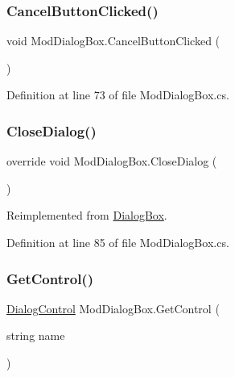 \subsubsection{\texorpdfstring{Cancel\+Button\+Clicked()}{CancelButtonClicked()}}
{\footnotesize\ttfamily void Mod\+Dialog\+Box.\+Cancel\+Button\+Clicked (\begin{DoxyParamCaption}{ }\end{DoxyParamCaption})}



Definition at line 73 of file Mod\+Dialog\+Box.\+cs.

\mbox{\label{class_mod_dialog_box_ad5168655ce50919439a1a6f2c0dcb207}} 
\subsubsection{\texorpdfstring{Close\+Dialog()}{CloseDialog()}}
{\footnotesize\ttfamily override void Mod\+Dialog\+Box.\+Close\+Dialog (\begin{DoxyParamCaption}{ }\end{DoxyParamCaption})\hspace{0.3cm}{\ttfamily [virtual]}}



Reimplemented from \hyperlink{class_dialog_box_ad4f408b78d5e109525c229ad34f5a447}{Dialog\+Box}.



Definition at line 85 of file Mod\+Dialog\+Box.\+cs.

\mbox{\label{class_mod_dialog_box_a2a5dae99d27fad2ba666e6833622688c}} 
\subsubsection{\texorpdfstring{Get\+Control()}{GetControl()}}
{\footnotesize\ttfamily \hyperlink{class_dialog_control}{Dialog\+Control} Mod\+Dialog\+Box.\+Get\+Control (\begin{DoxyParamCaption}\item[{string}]{name }\end{DoxyParamCaption})}



